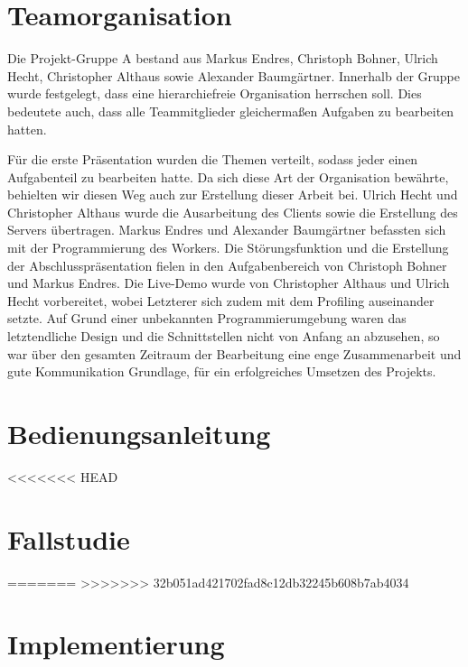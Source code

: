 \documentclass[10pt,a4paper]{article}
\begin{document}
\section{Teamorganisation}	%
Die Projekt-Gruppe A bestand aus Markus Endres, Christoph Bohner, Ulrich Hecht, Christopher Althaus sowie Alexander Baumgärtner. Innerhalb der Gruppe wurde festgelegt, dass eine hierarchiefreie Organisation herrschen soll. Dies bedeutete auch, dass alle Teammitglieder gleichermaßen Aufgaben zu bearbeiten hatten. 

Für die erste Präsentation wurden die Themen verteilt, sodass jeder einen Aufgabenteil zu bearbeiten hatte. Da sich diese Art der Organisation bewährte, behielten wir diesen Weg auch zur Erstellung dieser Arbeit bei. Ulrich Hecht und Christopher Althaus wurde die Ausarbeitung des Clients sowie die Erstellung des Servers übertragen. Markus Endres und Alexander Baumgärtner befassten sich mit der Programmierung des Workers. Die Störungsfunktion und die Erstellung der Abschlusspräsentation fielen in den Aufgabenbereich von Christoph Bohner und Markus Endres. Die Live-Demo wurde von Christopher Althaus und Ulrich Hecht vorbereitet, wobei Letzterer sich zudem mit dem Profiling auseinander setzte.  Auf Grund einer unbekannten Programmierumgebung waren das letztendliche Design und die Schnittstellen nicht von Anfang an abzusehen, so war über den gesamten Zeitraum der Bearbeitung eine enge Zusammenarbeit und gute Kommunikation Grundlage, für ein erfolgreiches Umsetzen des Projekts.
\newpage
\section{Bedienungsanleitung}

<<<<<<< HEAD
\section{Fallstudie}

=======
>>>>>>> 32b051ad421702fad8c12db32245b608b7ab4034
\section{Implementierung}

%
%
%
\end{document}
